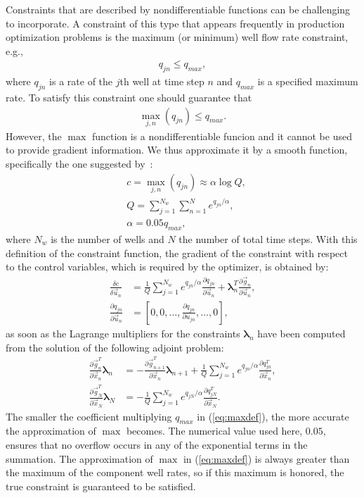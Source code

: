 \documentclass[twocolumn,numbook]{svjour3}          %
\newcommand{\pder}[2]{\frac{\partial #1}{\partial #2}}
\def\u{{\vec u}}
\def\x{{\vec x}}
\def\p{{\vec{g}}}
\def\blambda{{\pmb{\lambda}}}%
\begin{document}
Constraints that are described by nondifferentiable functions can be challenging
to incorporate. A constraint of this type that appears frequently in production
optimization problems is the maximum (or minimum) well flow rate constraint,
e.g.,
%
\begin{align}
q_{jn} \leq q_{max},
\end{align}
%
where $q_{jn}$ is a rate of the $j$th well at time step $n$ and $q_{max}$ is a specified maximum rate.
To satisfy this constraint one should guarantee that
\begin{align}
\max_{j,n}{(q_{jn})} \leq q_{max}.
\end{align}
However, the $\max$ function is a nondifferentiable funcion 
and it cannot be used to provide
gradient information.  We thus approximate it by a smooth
function, specifically the one suggested by~\cite{Bertsekas}:
%
\begin{align} \label{eq:maxdef} &c = \max_{j,n}(q_{jn}) \approx \alpha
\log{Q}, \nonumber \\
&Q = \sum_{j=1}^{N_w}\sum_{n=1}^{N} e^{q_{jn}/\alpha}, \\ 
&\alpha = 0.05 q_{max}, \end{align}
%
where $N_w$ is the number of wells and $N$ the number of total time steps. 
With this definition of the constraint
function, the gradient of the constraint with respect to the control variables,
  which is required by the optimizer, is obtained by:
\begin{align} \label{eq:constraintGradient} \frac{\delta c}{\delta \u_n} &=
\frac{1}{Q}\sum_{j=1}^{N_w} e^{q_{jn}/\alpha} \pder{q_{jn}}{\u_n} +\blambda^T_n\pder{\p_n}{\u_n},  
\nonumber \\
\pder{q_{jn}}{\u_{n}} &= \left [ 0, 0, \ldots, \pder{q_{jn}}{u_{jn}}, \ldots, 0 \right ],
\end{align}
%
as soon as the Lagrange multipliers for the constraints $\blambda_n$ have been
computed from the solution of the following adjoint problem:
  \begin{align}
\label{eq:discreteODEConstraints}
 \pder{\p_n^T}{\x_n}  \blambda_n &= -
\pder{\p_{n+1}^T}{\x_n} \blambda_{n+1} + 
\frac{1}{Q}\sum_{j=1}^{N_w} e^{q_{jn}/\alpha} \pder{q^T_{jn}}{\x_n}, 
\\
\label{eq:discreteBCConstraints}
\pder{\p_N^T}{\x_N} \blambda_N &= -
\frac{1}{Q}\sum_{j=1}^{N_w} e^{q_{jN}/\alpha} \pder{q^T_{jN}}{\x_N}.
\end{align}
The smaller the coefficient multiplying $q_{max}$ in (\ref{eq:maxdef}), the more accurate the
approximation of $\max$ becomes. The numerical value used here, $0.05$, ensures
that no overflow occurs in any of the exponential terms in the summation. The
approximation of $\max$ in (\ref{eq:maxdef}) is always greater than the maximum
of the component well rates, so if this maximum is honored, the true constraint
is guaranteed to be satisfied.
\end{document}
